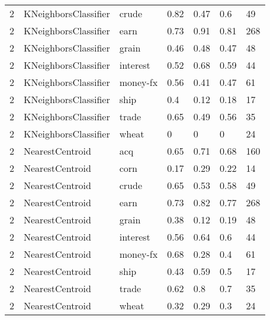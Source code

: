 \documentclass{article}
\begin{document}
\begin{table}[h]
\begin{tabular}{lllllll}
2             & KNeighborsClassifier   & crude           & 0.82               & 0.47            & 0.6               & 49               \\
2             & KNeighborsClassifier   & earn            & 0.73               & 0.91            & 0.81              & 268              \\
2             & KNeighborsClassifier   & grain           & 0.46               & 0.48            & 0.47              & 48               \\
2             & KNeighborsClassifier   & interest        & 0.52               & 0.68            & 0.59              & 44               \\
2             & KNeighborsClassifier   & money-fx        & 0.56               & 0.41            & 0.47              & 61               \\
2             & KNeighborsClassifier   & ship            & 0.4                & 0.12            & 0.18              & 17               \\
2             & KNeighborsClassifier   & trade           & 0.65               & 0.49            & 0.56              & 35               \\
2             & KNeighborsClassifier   & wheat           & 0                  & 0               & 0                 & 24               \\
2             & NearestCentroid        & acq             & 0.65               & 0.71            & 0.68              & 160              \\
2             & NearestCentroid        & corn            & 0.17               & 0.29            & 0.22              & 14               \\
2             & NearestCentroid        & crude           & 0.65               & 0.53            & 0.58              & 49               \\
2             & NearestCentroid        & earn            & 0.73               & 0.82            & 0.77              & 268              \\
2             & NearestCentroid        & grain           & 0.38               & 0.12            & 0.19              & 48               \\
2             & NearestCentroid        & interest        & 0.56               & 0.64            & 0.6               & 44               \\
2             & NearestCentroid        & money-fx        & 0.68               & 0.28            & 0.4               & 61               \\
2             & NearestCentroid        & ship            & 0.43               & 0.59            & 0.5               & 17               \\
2             & NearestCentroid        & trade           & 0.62               & 0.8             & 0.7               & 35               \\
2             & NearestCentroid        & wheat           & 0.32               & 0.29            & 0.3               & 24               \\\end{tabular}
\end{table}
\end{document}
